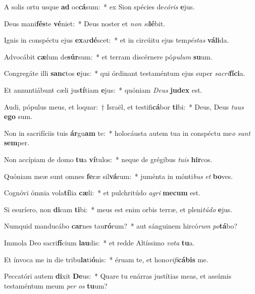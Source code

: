 \item A solis ortu usque \textbf{ad} oc\textbf{cá}sum:~* ex Sion spécies de\textit{có}\textit{ris} \textbf{e}jus.
\item Deus mani\textbf{fés}te \textbf{vé}niet:~* Deus noster et \textit{non} \textit{si}\textbf{lé}bit.
\item Ignis in conspéctu ejus \textbf{ex}ar\textbf{dé}scet:~* et in circúitu ejus tem\textit{pés}\textit{tas} \textbf{vá}\textbf{li}da.
\item Advocábit \textbf{cæ}lum de\textbf{súr}sum:~* et terram discérnere pó\textit{pu}\textit{lum} \textbf{su}um.
\item Congregáte illi \textbf{sanc}tos \textbf{e}jus:~* qui órdinant testaméntum ejus super \textit{sa}\textit{cri}\textbf{fí}\textbf{ci}a.
\item Et annuntiábunt cæli jus\textbf{tí}tiam \textbf{e}jus:~* quóniam \textit{De}\textit{us} \textbf{ju}\textbf{dex} est.
\item Audi, pópulus meus, et loquar:~† Israël, et testifi\textbf{cá}bor \textbf{ti}bi:~* Deus, Deus \textit{tu}\textit{us} \textbf{e}\textbf{go} sum.
\item Non in sacrifíciis tuis \textbf{ár}gu\textbf{am} te:~* holocáusta autem tua in conspéctu me\textit{o} \textit{sunt} \textbf{sem}per.
\item Non accípiam de domo \textbf{tu}a \textbf{ví}tulos:~* neque de grégibus \textit{tu}\textit{is} \textbf{hir}cos.
\item Quóniam meæ sunt omnes \textbf{fe}ræ sil\textbf{vá}rum:~* juménta in mónti\textit{bus} \textit{et} \textbf{bo}ves.
\item Cognóvi ómnia vola\textbf{tí}lia \textbf{cæ}li:~* et pulchritúdo \textit{a}\textit{gri} \textbf{me}\textbf{cum} est.
\item Si esuríero, non \textbf{di}cam \textbf{ti}bi:~* meus est enim orbis terræ, et pleni\textit{tú}\textit{do} \textbf{e}jus.
\item Numquid manducábo \textbf{car}nes tau\textbf{ró}rum?~* aut sánguinem hircó\textit{rum} \textit{po}\textbf{tá}bo?
\item Immola Deo sacri\textbf{fí}cium \textbf{lau}dis:~* et redde Altíssimo \textit{vo}\textit{ta} \textbf{tu}a.
\item Et ínvoca me in die tribu\textbf{la}ti\textbf{ó}nis:~* éruam te, et hono\textit{ri}\textit{fi}\textbf{cá}\textbf{bis} me.
\item Peccatóri autem \textbf{di}xit \textbf{De}us:~* Quare tu enárras justítias meas, et assúmis testaméntum meum \textit{per} \textit{os} \textbf{tu}um?
